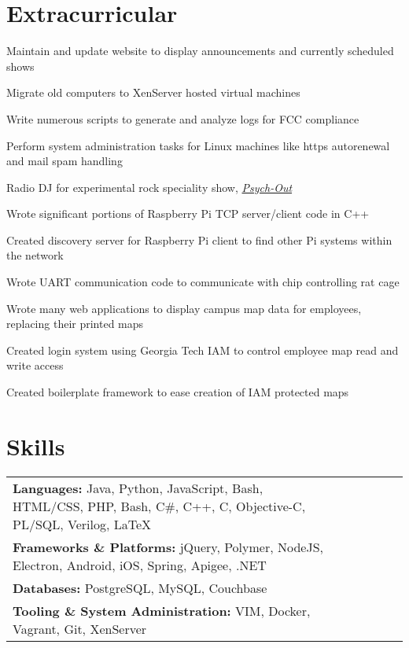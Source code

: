 \documentclass[line]{resume}
\begin{document}
\section{Extracurricular}
\begin{myitemize}
	\item Maintain and update website to display announcements and currently scheduled shows 
	\item Migrate old computers to XenServer hosted virtual machines
	\item Write numerous scripts to generate and analyze logs for FCC compliance
	\item Perform system administration tasks for Linux machines like https autorenewal and mail spam handling
	\item Radio DJ for experimental rock speciality show, \href{https://www.wrek.org/psychout/}{\textit{Psych-Out}} 
\end{myitemize}

\begin{myitemize}
	\item Wrote significant portions of Raspberry Pi TCP server/client code in C++ 
	\item Created discovery server for Raspberry Pi client to find other Pi systems within the network 
	\item Wrote UART communication code to communicate with chip controlling rat cage 
\end{myitemize}

\begin{myitemize}
	\item Wrote many web applications to display campus map data for employees, replacing their printed maps
	\item Created login system using Georgia Tech IAM to control employee map read and write access 
	\item Created boilerplate framework to ease creation of IAM protected maps 
\end{myitemize}
\section{Skills}
\begin{tabular}{l l l l l l}
	\textbf{Languages:} Java, Python, JavaScript, Bash, HTML/CSS, PHP, Bash, C\#, C++, C, Objective-C, PL/SQL, Verilog, \LaTeX \\
	\textbf{Frameworks \& Platforms:} jQuery, Polymer, NodeJS, Electron, Android, iOS, Spring, Apigee, .NET \\
	\textbf{Databases:} PostgreSQL, MySQL, Couchbase \\
	\textbf{Tooling \& System Administration:}  VIM, Docker, Vagrant, Git, XenServer \\
\end{tabular}
\end{document}
